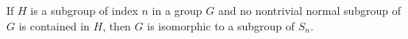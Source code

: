 If $H$ is a subgroup of index $n$ in a group $G$ and no nontrivial normal subgroup of $G$ is contained in $H$, then $G$ is isomorphic to a subgroup of $S_n$.
